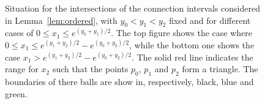 \begin{figure}[!t]
\caption{Situation for the intersections of the connection intervals considered in Lemma~\ref{lem:ordered}, with $y_0 < y_1 <y_2$ fixed and for different cases of $0 \le x_1 \le e^{(y_0 + y_1)/2}$. The top figure shows the case where $0 \le x_1 \le e^{(y_1 + y_2)/2} - e^{(y_0 + y_2)/2}$, while the bottom one shows the case $x_1 > e^{(y_1 + y_2)/2} - e^{(y_0 + y_2)/2}$. The solid red line indicates the range for $x_2$ such that the points $p_0$, $p_1$ and $p_2$ form a triangle. The boundaries of there balls are show in, respectively, black, blue and green.}
\label{fig:triangle_prob_lemma}
\end{figure}

